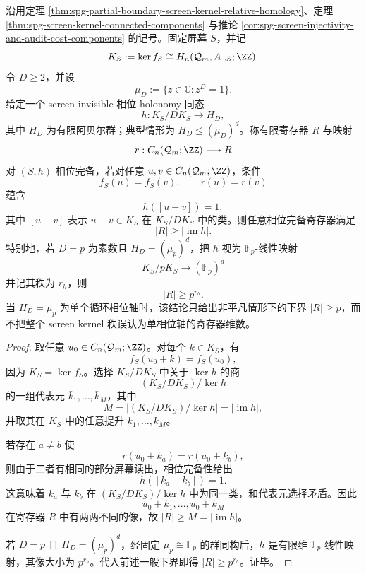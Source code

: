 \begin{proposition}\label{distill:bourgain-multiscale_decoupling_gates-spg-screen-phase-holonomy-register-lower-bound}
沿用定理 \ref{thm:spg-partial-boundary-screen-kernel-relative-homology}、定理 \ref{thm:spg-screen-kernel-connected-components} 与推论 \ref{cor:spg-screen-injectivity-and-audit-cost-components} 的记号。固定屏幕 \(S\)，并记
\[
K_S:=\ker f_S\cong H_n(\mathcal Q_m,A_{\neg S};\ZZ).
\]
令 \(D\ge2\)，并设
\[
\mu_D:=\{z\in\mathbb C:z^D=1\}.
\]
给定一个 screen-invisible 相位 holonomy 同态
\[
h:K_S/DK_S\longrightarrow H_D,
\]
其中 \(H_D\) 为有限阿贝尔群；典型情形为 \(H_D\le(\mu_D)^d\)。称有限寄存器 \(R\) 与映射
\[
r:C_n(\mathcal Q_m;\ZZ)\longrightarrow R
\]
对 \((S,h)\) 相位完备，若对任意 \(u,v\in C_n(\mathcal Q_m;\ZZ)\)，条件
\[
f_S(u)=f_S(v),
\qquad
r(u)=r(v)
\]
蕴含
\[
h([u-v])=1,
\]
其中 \([u-v]\) 表示 \(u-v\in K_S\) 在 \(K_S/DK_S\) 中的类。则任意相位完备寄存器满足
\[
|R|\ge |\operatorname{im}h|.
\]
特别地，若 \(D=p\) 为素数且 \(H_D=(\mu_p)^d\)，把 \(h\) 视为 \(\mathbb F_p\)-线性映射
\[
K_S/pK_S\longrightarrow (\mathbb F_p)^d
\]
并记其秩为 \(r_h\)，则
\[
|R|\ge p^{r_h}.
\]
当 \(H_D=\mu_p\) 为单个循环相位轴时，该结论只给出非平凡情形下的下界 \(|R|\ge p\)，而不把整个 screen kernel 秩误认为单相位轴的寄存器维数。
\end{proposition}
\begin{proof}
取任意 \(u_0\in C_n(\mathcal Q_m;\ZZ)\)。对每个 \(k\in K_S\)，有
\[
f_S(u_0+k)=f_S(u_0),
\]
因为 \(K_S=\ker f_S\)。选择 \(K_S/DK_S\) 中关于 \(\ker h\) 的商
\[
(K_S/DK_S)/\ker h
\]
的一组代表元 \(\bar k_1,
\ldots,
\bar k_M\)，其中
\[
M=|(K_S/DK_S)/\ker h|=|\operatorname{im}h|,
\]
并取其在 \(K_S\) 中的任意提升 \(k_1,
\ldots,
 k_M\)。

若存在 \(a\ne b\) 使
\[
r(u_0+k_a)=r(u_0+k_b),
\]
则由于二者有相同的部分屏幕读出，相位完备性给出
\[
h([k_a-k_b])=1.
\]
这意味着 \(\bar k_a\) 与 \(\bar k_b\) 在 \((K_S/DK_S)/\ker h\) 中为同一类，和代表元选择矛盾。因此
\[
u_0+k_1,
\ldots,
u_0+k_M
\]
在寄存器 \(R\) 中有两两不同的像，故 \(|R|\ge M=|\operatorname{im}h|\)。

若 \(D=p\) 且 \(H_D=(\mu_p)^d\)，经固定 \(\mu_p\cong\mathbb F_p\) 的群同构后，\(h\) 是有限维 \(\mathbb F_p\)-线性映射，其像大小为 \(p^{r_h}\)。代入前述一般下界即得 \(|R|\ge p^{r_h}\)。证毕。
\end{proof}


\endinput
